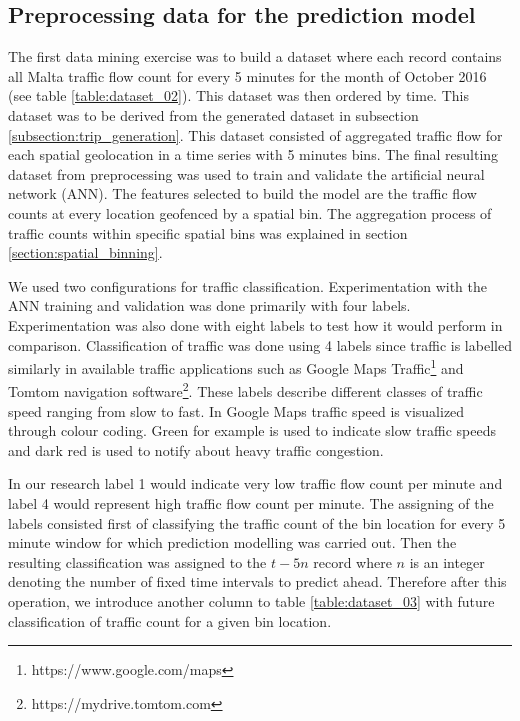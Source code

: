 \documentclass[12pt, a4paper]{report}
\theoremstyle{definition}
\theoremstyle{definition}%
\theoremstyle{definition}%
\theoremstyle{definition}%
\theoremstyle{definition}%
\theoremstyle{definition}%
\begin{document}
\subsection{Preprocessing data for the prediction model} \label{subsection:Preprocessing data for the prediction model}
The first data mining exercise was to build a dataset where each record contains all Malta traffic flow count for every 5 minutes for the month of October 2016 (see table \ref{table:dataset_02}). This dataset was then ordered by time. This dataset was to be derived from the generated dataset in subsection \ref{subsection:trip_generation}. This dataset consisted of aggregated traffic flow for each spatial geolocation in a time series with 5 minutes bins. The final resulting dataset from preprocessing was used to train and validate the artificial neural network (ANN). The features selected to build the model are the traffic flow counts at every location geofenced by a spatial bin. The aggregation process of traffic counts within specific spatial bins was explained in section \ref{section:spatial_binning}.

We used two configurations for traffic classification. Experimentation with the ANN training and validation was done primarily with four labels. Experimentation was also done with eight labels to test how it would perform in comparison. Classification of traffic was done using 4 labels since traffic is labelled similarly in available traffic applications such as Google Maps Traffic\footnote{https://www.google.com/maps} and Tomtom navigation software\footnote{https://mydrive.tomtom.com}. These labels describe different classes of traffic speed ranging from slow to fast. In Google Maps traffic speed is visualized through colour coding. Green for example is used to indicate slow traffic speeds and dark red is used to notify about heavy traffic congestion.  

In our research label 1 would indicate very low traffic flow count per minute and label 4 would represent high traffic flow count per minute. The assigning of the labels consisted first of classifying the traffic count of the bin location for every 5 minute window for which prediction modelling was carried out.  Then the resulting classification was assigned to the $t - 5n$ record where $n$ is an integer denoting the number of fixed time intervals to predict ahead. Therefore after this operation, we introduce another column to table \ref{table:dataset_03} with future classification of traffic count for a given bin location. 
\end{document}
